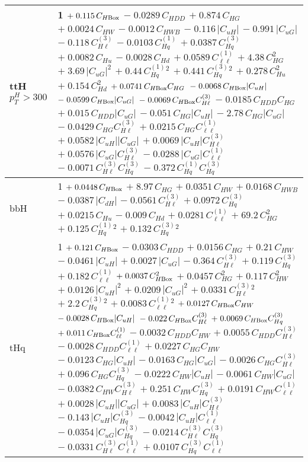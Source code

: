 \begin{tabular}{l|p{}}
    ttH $p_{T}^{H} > 300$ & 1 $+\;0.115\,C_{H\rm{Box}}$ $-\;0.0289\,C_{HDD}$ $+\;0.874\,C_{HG}$ $+\;0.0024\,C_{HW}$ $-\;0.0012\,C_{HWB}$ $-\;0.116\,|C_{uH}|$ $-\;0.991\,|C_{uG}|$ $-\;0.118\,C^{(3)}_{H\ell}$ $-\;0.0103\,C^{(1)}_{Hq}$ $+\;0.0387\,C^{(3)}_{Hq}$ $+\;0.0082\,C_{Hu}$ $-\;0.0028\,C_{Hd}$ $+\;0.0589\,C^{(1)}_{\ell\ell}$ $+\;4.38\,C_{HG}^{2}$ $+\;3.69\,|C_{uG}|^{2}$ $+\;0.44\,C^{(1)}_{Hq}^{2}$ $+\;0.441\,C^{(3)}_{Hq}^{2}$ $+\;0.278\,C_{Hu}^{2}$ $+\;0.154\,C_{Hd}^{2}$ $+\;0.0741\,C_{H\rm{Box}}C_{HG}$ $-\;0.0068\,C_{H\rm{Box}}|C_{uH}|$ $-\;0.0599\,C_{H\rm{Box}}|C_{uG}|$ $-\;0.0069\,C_{H\rm{Box}}C^{(3)}_{H\ell}$ $-\;0.0185\,C_{HDD}C_{HG}$ $+\;0.015\,C_{HDD}|C_{uG}|$ $-\;0.051\,C_{HG}|C_{uH}|$ $-\;2.78\,C_{HG}|C_{uG}|$ $-\;0.0429\,C_{HG}C^{(3)}_{H\ell}$ $+\;0.0215\,C_{HG}C^{(1)}_{\ell\ell}$ $+\;0.0582\,|C_{uH}||C_{uG}|$ $+\;0.0069\,|C_{uH}|C^{(3)}_{H\ell}$ $+\;0.0576\,|C_{uG}|C^{(3)}_{H\ell}$ $-\;0.0288\,|C_{uG}|C^{(1)}_{\ell\ell}$ $-\;0.0071\,C^{(3)}_{H\ell}C^{(3)}_{Hq}$ $-\;0.372\,C^{(1)}_{Hq}C^{(3)}_{Hq}$ \\
    \hline
    bbH & 1 $+\;0.0448\,C_{H\rm{Box}}$ $+\;8.97\,C_{HG}$ $+\;0.0351\,C_{HW}$ $+\;0.0168\,C_{HWB}$ $-\;0.0387\,|C_{dH}|$ $-\;0.0561\,C^{(3)}_{H\ell}$ $+\;0.0972\,C^{(3)}_{Hq}$ $+\;0.0215\,C_{Hu}$ $-\;0.009\,C_{Hd}$ $+\;0.0281\,C^{(1)}_{\ell\ell}$ $+\;69.2\,C_{HG}^{2}$ $+\;0.125\,C^{(1)}_{Hq}^{2}$ $+\;0.132\,C^{(3)}_{Hq}^{2}$ \\
    \hline
    tHq & 1 $+\;0.121\,C_{H\rm{Box}}$ $-\;0.0303\,C_{HDD}$ $+\;0.0156\,C_{HG}$ $+\;0.21\,C_{HW}$ $-\;0.0461\,|C_{uH}|$ $+\;0.0027\,|C_{uG}|$ $-\;0.364\,C^{(3)}_{H\ell}$ $+\;0.119\,C^{(3)}_{Hq}$ $+\;0.182\,C^{(1)}_{\ell\ell}$ $+\;0.0037\,C_{H\rm{Box}}^{2}$ $+\;0.0457\,C_{HG}^{2}$ $+\;0.117\,C_{HW}^{2}$ $+\;0.0126\,|C_{uH}|^{2}$ $+\;0.0209\,|C_{uG}|^{2}$ $+\;0.0331\,C^{(3)}_{H\ell}^{2}$ $+\;2.2\,C^{(3)}_{Hq}^{2}$ $+\;0.0083\,C^{(1)}_{\ell\ell}^{2}$ $+\;0.0127\,C_{H\rm{Box}}C_{HW}$ $-\;0.0028\,C_{H\rm{Box}}|C_{uH}|$ $-\;0.022\,C_{H\rm{Box}}C^{(3)}_{H\ell}$ $+\;0.0069\,C_{H\rm{Box}}C^{(3)}_{Hq}$ $+\;0.011\,C_{H\rm{Box}}C^{(1)}_{\ell\ell}$ $-\;0.0032\,C_{HDD}C_{HW}$ $+\;0.0055\,C_{HDD}C^{(3)}_{H\ell}$ $-\;0.0028\,C_{HDD}C^{(1)}_{\ell\ell}$ $+\;0.0227\,C_{HG}C_{HW}$ $-\;0.0123\,C_{HG}|C_{uH}|$ $-\;0.0163\,C_{HG}|C_{uG}|$ $-\;0.0026\,C_{HG}C^{(3)}_{H\ell}$ $+\;0.096\,C_{HG}C^{(3)}_{Hq}$ $-\;0.0222\,C_{HW}|C_{uH}|$ $-\;0.0061\,C_{HW}|C_{uG}|$ $-\;0.0382\,C_{HW}C^{(3)}_{H\ell}$ $+\;0.251\,C_{HW}C^{(3)}_{Hq}$ $+\;0.0191\,C_{HW}C^{(1)}_{\ell\ell}$ $+\;0.0028\,|C_{uH}||C_{uG}|$ $+\;0.0083\,|C_{uH}|C^{(3)}_{H\ell}$ $-\;0.143\,|C_{uH}|C^{(3)}_{Hq}$ $-\;0.0042\,|C_{uH}|C^{(1)}_{\ell\ell}$ $-\;0.0354\,|C_{uG}|C^{(3)}_{Hq}$ $-\;0.0214\,C^{(3)}_{H\ell}C^{(3)}_{Hq}$ $-\;0.0331\,C^{(3)}_{H\ell}C^{(1)}_{\ell\ell}$ $+\;0.0107\,C^{(3)}_{Hq}C^{(1)}_{\ell\ell}$ \\

\end{tabular}
